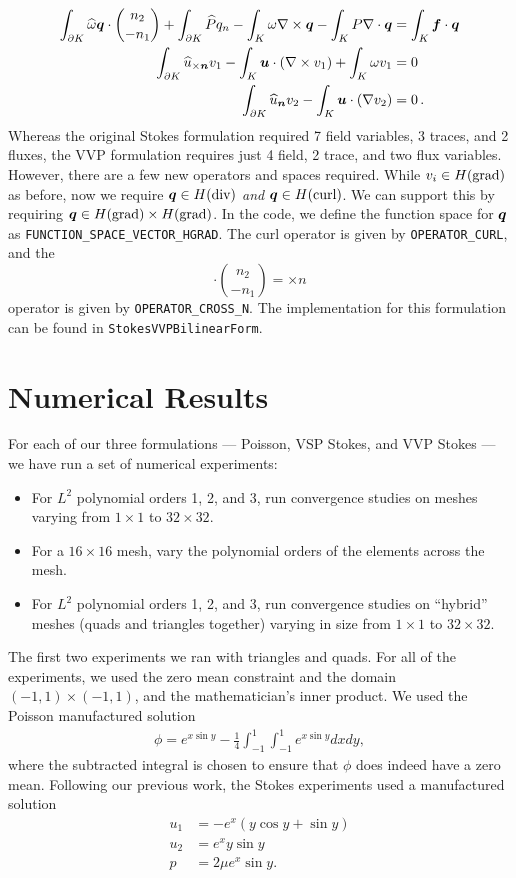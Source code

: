 \begin{align*}
\int_{\partial K} \widehat{\omega} \vect{q} \cdot {n_{2} \choose -n_{1}} + \int_{\partial K} \widehat{P} q_{n} -  \int_{K}\omega \NVRcurl \vect{q} -  \int_{K} P \NVRdiv \vect{q} &= \int_{K} \vect{f} \cdot \vect{q}\\
\int_{\partial K} \widehat{u}_{\times \vect{n}}v_{1} -  \int_{K}\vect{u} \cdot (\NVRcurl v_{1}) +  \int_{K} \omega v_{1} &= 0\\
\int_{\partial K} \widehat{u}_{\vect{n}} v_{2} -  \int_{K}\vect{u} \cdot (\NVRgrad v_{2}) &= 0 \,.
\end{align*}
Whereas the original Stokes formulation required 7 field variables, 3 traces, and 2 fluxes, the VVP formulation requires just 4 field, 2 trace, and two flux variables.  However, there are a few new operators and spaces required.  While $v_{i} \in \NVRHgrad$ as before, now we require $\vect{q} \in \NVRHdiv$ \emph{and} $\vect{q} \in \NVRHcurl$.  We can support this by requiring $\vect{q} \in \NVRHgrad \times \NVRHgrad$.  In the code, we define the function space for $\vect{q}$ as \verb=FUNCTION_SPACE_VECTOR_HGRAD=.  The curl operator is given by \verb=OPERATOR_CURL=, and the \[ \displaystyle \cdot {n_{2} \choose -n_{1}}=\times n\] operator is given by \verb=OPERATOR_CROSS_N=.
The implementation for this formulation can be found in \verb=StokesVVPBilinearForm=.

\section{Numerical Results}\label{NVR:sec:numericalResults}
For each of our three formulations --- Poisson, VSP Stokes, and VVP Stokes --- we have run a set of numerical experiments:
\begin{itemize}
\item For $L^{2}$ polynomial orders 1, 2, and 3, run convergence studies on meshes varying from $1 \times 1$ to $32 \times 32$.
\item For a $16 \times 16$ mesh, vary the polynomial orders of the elements across the mesh.
\item For $L^{2}$ polynomial orders 1, 2, and 3, run convergence studies on ``hybrid'' meshes (quads and triangles together) varying in size from $1 \times 1$ to $32 \times 32$.
\end{itemize}

The first two experiments we ran with triangles and quads.  For all of the experiments, we used the zero mean constraint and the domain $(-1,1) \times (-1,1)$, and the mathematician's inner product.  We used the Poisson manufactured solution
\begin{align*}
\phi = e^{x \sin y} - \frac{1}{4} \int_{-1}^{1} \int_{-1}^{1} e^{x \sin y} dx dy,
\end{align*}
where the subtracted integral is chosen to ensure that $\phi$ does indeed have a zero mean.  Following our previous work, the Stokes experiments used a manufactured solution
\begin{align*}
u_{1} &=  -e^{x} ( y \cos y + \sin y )\\
u_{2} &=  e^{x}  y \sin y\\
p &= 2 \mu e^{x} \sin y.
\end{align*}

